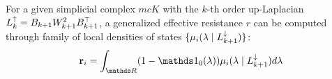 
\begin{thm}\label{thm:GER_DOS}
      For a given simplicial complex \( mc K \) with the \(k\)-th order up-Laplacian \( L_{k}^{\uparrow} = B_{k+1} W_{k+1}^2 B_{k+1}^\top\), a generalized effective resistance \( r \) can be computed through family of local densities of states \( \{ \mu_i(\lambda \mid L_{k+1 }^{\downarrow}) \} \):
      \begin{equation}
            \b r_i = \int_{\ds R } (1 - \ds 1_0(\lambda)) \mu_i ( \lambda \mid \Ld {k+1} ) d\lambda 
      \end{equation}
\end{thm}
\begin{comment}
\todo{weighted egdges === BAD ?}
\begin{proof}
      Let \( B_{k+1} W_{k+1} = U S V^\top\) where \( S \) is diagonal and invertible and both \( U \) and \( V \) are orthogonal (so it is a truncated SVD decomposition of \( B_{k+1} W_{k+1} \) matrix with eliminated obsolete kernel). Then:
      \begin{equation}
            ( \Lu k )^\dagger = \left( B_{k+1} W_{k+1}^2 B_{k+1}^\top \right)^\dagger = \left( U S^2 U^\top \right)^\dagger = U S^{-2} U^\top
      \end{equation}
      \begin{equation}
            \begin{aligned}
                  \b r & = \diag \left( W_{k+1} B_{k+1}^\top ( \Lu k )^\dagger B_{k+1} W_{k+1} \right)  =  \\
                  & = \diag \left(  V S U^\top U S^{-2} U^\top U S V^\top \right) = \diag \left(  V V^\top \right)
            \end{aligned}
      \end{equation}
      As a result, \( \b r_i = \| V_{ i \cdot } \|^2 = \sum_j | v_{ij} |^2  \), so the \(i\)-th entry of the resistance is defined by the sum of square of \(i\)-th components of eigenvectors \( \b v_j \) of \( \Ld {k+1} = W_{k+1} B_{k+1}^\top B_{k+1} W_{k+1} \) operator where \( \b v_j \perp \ker \Ld {k+1} \).


\end{comment}
